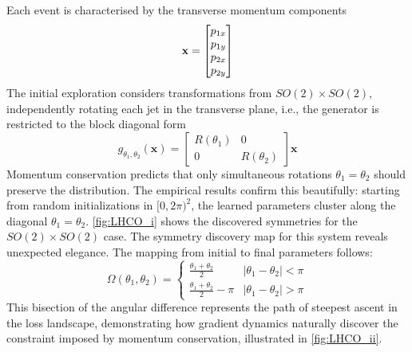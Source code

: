             Each event is characterised by the transverse momentum components
            \[
                \mathbf{x} = \mqty[p_{1x} \\ p_{1y} \\ p_{2x} \\ p_{2y}]
            \]
            The initial exploration considers transformations from \(SO(2) \times SO(2)\), independently rotating each jet in the transverse plane,
            i.e., the generator is restricted to the block diagonal form
            \[
                g_{\theta_1,\theta_2}(\mathbf{x}) = \begin{bmatrix}
                    R(\theta_1) & 0 \\
                    0 & R(\theta_2)
                \end{bmatrix} \mathbf{x}
            \]
            Momentum conservation predicts that only simultaneous rotations \(\theta_1 = \theta_2\) should preserve the distribution.
            The empirical results confirm this beautifully: starting from random initializations in \([0, 2\pi)^2\), the learned parameters cluster along the diagonal \(\theta_1 = \theta_2\).
            \cref{fig:LHCO_i} shows the discovered symmetries for the \(SO(2) \times SO(2)\) case.
            The symmetry discovery map for this system reveals unexpected elegance.
            The mapping from initial to final parameters follows:
            \[
                \Omega(\theta_1, \theta_2) = \begin{cases}
                    \frac{\theta_1 + \theta_2}{2} & |\theta_1 - \theta_2| < \pi \\
                    \frac{\theta_1 + \theta_2}{2} - \pi & |\theta_1 - \theta_2| > \pi
                \end{cases}
            \]
            This bisection of the angular difference represents the path of steepest ascent in the loss landscape, demonstrating how gradient dynamics naturally discover the constraint imposed by momentum conservation, illustrated in \cref{fig:LHCO_ii}.
